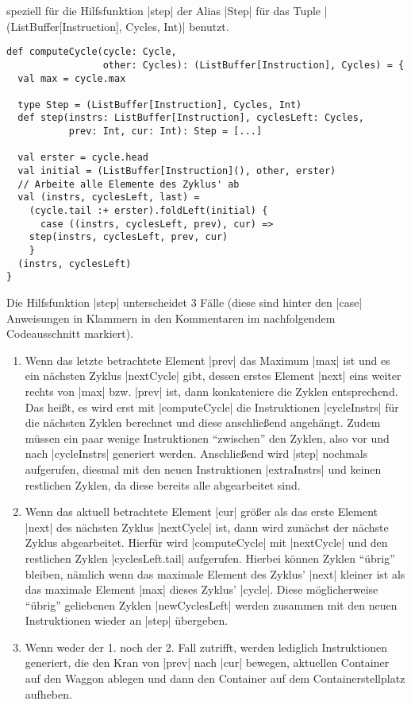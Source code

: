 speziell für die Hilfsfunktion |step| der Alias |Step| für das Tuple |(ListBuffer[Instruction], Cycles, Int)| benutzt.
\lstset{basicstyle=\ttfamily\small}
\begin{lstlisting}
def computeCycle(cycle: Cycle,
                 other: Cycles): (ListBuffer[Instruction], Cycles) = {
  val max = cycle.max

  type Step = (ListBuffer[Instruction], Cycles, Int)
  def step(instrs: ListBuffer[Instruction], cyclesLeft: Cycles,
           prev: Int, cur: Int): Step = [...]

  val erster = cycle.head
  val initial = (ListBuffer[Instruction](), other, erster)
  // Arbeite alle Elemente des Zyklus' ab
  val (instrs, cyclesLeft, last) =
    (cycle.tail :+ erster).foldLeft(initial) {
      case ((instrs, cyclesLeft, prev), cur) =>
	step(instrs, cyclesLeft, prev, cur)
    }
  (instrs, cyclesLeft)
}
\end{lstlisting}
\lstset{basicstyle=\ttfamily}
Die Hilfsfunktion |step| unterscheidet 3 Fälle (diese sind hinter den |case| Anweisungen in Klammern in den Kommentaren im nachfolgendem Codeausschnitt markiert).
\begin{enumerate}
 \item Wenn das letzte betrachtete Element |prev| das Maximum |max| ist und es ein nächsten Zyklus |nextCycle| gibt,
       dessen erstes Element |next| eins weiter rechts von |max| bzw. |prev| ist, dann konkateniere die Zyklen entsprechend.
       Das heißt, es wird erst mit |computeCycle| die Instruktionen |cycleInstrs| für die nächsten Zyklen berechnet
       und diese anschließend angehängt. Zudem müssen ein paar wenige Instruktionen ``zwischen'' den Zyklen,
       also vor und nach |cycleInstrs| generiert werden. Anschließend wird |step| nochmals aufgerufen,
       diesmal mit den neuen Instruktionen |extraInstrs| und keinen restlichen Zyklen, da diese bereits alle abgearbeitet sind.
 \item Wenn das aktuell betrachtete Element |cur| größer als das erste Element |next| des nächsten Zyklus |nextCycle| ist,
       dann wird zunächst der nächste Zyklus abgearbeitet.
       Hierfür wird |computeCycle| mit |nextCycle| und den restlichen Zyklen |cyclesLeft.tail| aufgerufen.
       Hierbei können Zyklen ``übrig'' bleiben,
       nämlich wenn das maximale Element des Zyklus' |next| kleiner ist als das maximale Element |max| dieses Zyklus' |cycle|.
       Diese möglicherweise ``übrig'' geliebenen Zyklen |newCyclesLeft| werden zusammen mit den neuen Instruktionen wieder an |step| übergeben.
 \item Wenn weder der 1. noch der 2. Fall zutrifft, werden lediglich Instruktionen generiert,
       die den Kran von |prev| nach |cur| bewegen, aktuellen Container auf den Waggon ablegen und dann den Container auf dem Containerstellplatz aufheben.
\end{enumerate}
